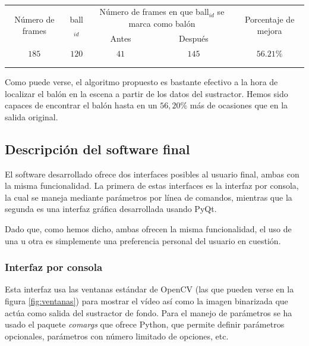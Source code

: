 \begin{table}
\centering
\begin{tabular}{|c|c|c|c|c|}
\hline
\multirow{2}{2cm}{Número de frames} & \multirow{2}{*}{ball$_{id}$} & \multicolumn{2}{m{4cm}|}{Número de frames en que ball$_{id}$ se marca como balón} & \multirow{2}{2cm}{Porcentaje de mejora} \\ \cline{3-4}
& & \multicolumn{1}{m{2cm}|}{Antes} & \multicolumn{1}{m{2cm}|}{Después} &  \\ \hline
 $185$ & $120$ & $41$ & $145$ & $56.21\%$ \\ \hline
 &  &  &  &  \\ \hline
 &  &  &  &  \\ \hline
\end{tabular}
\caption{ }
\label{tab:3}
\end{table}

Como puede verse, el algoritmo propuesto es bastante efectivo a la hora de localizar el balón en la escena a partir de los datos del sustractor. Hemos sido capaces de encontrar el balón hasta en un $56,20\%$ más de ocasiones que en la salida original.


\subsection{Descripción del software final}

El software desarrollado ofrece dos interfaces posibles al usuario final, ambas con la misma funcionalidad. La primera de estas interfaces es la interfaz por consola, la cual se maneja mediante parámetros por línea de comandos, mientras que la segunda es una interfaz gráfica desarrollada usando PyQt.

Dado que, como hemos dicho, ambas ofrecen la misma funcionalidad, el uso de una u otra es simplemente una preferencia personal del usuario en cuestión.

\subsubsection*{Interfaz por consola}
Esta interfaz usa las ventanas estándar de OpenCV (las que pueden verse en la figura \ref{fig:ventanas}) para mostrar el vídeo así como la imagen binarizada que actúa como salida del sustractor de fondo. Para el manejo de parámetros se ha usado el paquete \textit{comargs} que ofrece Python, que permite definir parámetros opcionales, parámetros con número limitado de opciones, etc.

